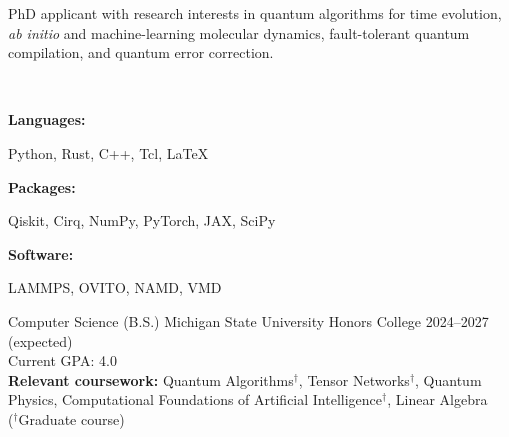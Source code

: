 \documentclass[9pt]{developercv} %
\begin{document}
\begin{minipage}[t]{0.46\textwidth}
\vspace{-6pt}

PhD applicant with research interests in quantum algorithms for time evolution, \emph{ab initio} and machine-learning molecular dynamics, fault-tolerant quantum compilation, and quantum error correction.
\end{minipage}
\hfill %
\begin{minipage}[t]{0.465\textwidth}
\\\begin{minipage}[t]{0.2\textwidth}
        \textbf{Languages:}
    \end{minipage}
    \hfill
    \begin{minipage}[t]{0.73\textwidth}
      Python, Rust, C++, Tcl, \LaTeX
    \end{minipage}
    \vspace{4mm}
    
    \begin{minipage}[t]{0.2\textwidth}
        \textbf{Packages:}
    \end{minipage}
    \hfill
    \begin{minipage}[t]{0.73\textwidth}
	Qiskit, Cirq, NumPy, PyTorch, JAX, SciPy
    \end{minipage}
	\vspace{4mm}

	\begin{minipage}[t]{0.2\textwidth}
        \textbf{Software:}
    \end{minipage}
    \hfill
    \begin{minipage}[t]{0.73\textwidth}
    LAMMPS, OVITO, NAMD, VMD
    \end{minipage}
    \vspace{1mm}
\end{minipage}

\vspace{-10 pt}
\begin{entrylist}
    \entry
		{\hspace{10pt}}
		{Computer Science (B.S.)}
		{Michigan State University Honors College}
		{2024--2027 (expected) \\ 
		Current GPA: 4.0 \\[4pt]
		\textbf{Relevant coursework:} Quantum Algorithms$^\dagger$, Tensor Networks$^\dagger$, Quantum Physics, Computational Foundations of Artificial Intelligence$^\dagger$, Linear Algebra 
		\\\vspace*{-9pt}({\footnotesize $^\dagger$Graduate course})}
\end{entrylist}
\end{document}
